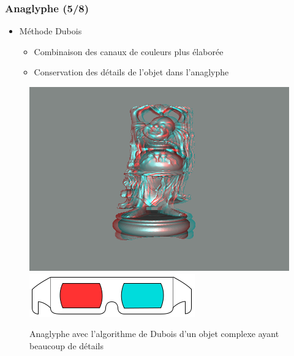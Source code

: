 \documentclass{beamer}
\begin{document}
%
\begin{frame}
\frametitle{Anaglyphe (5/8)}
\begin{itemize}[label=$\bullet$]
\item Méthode Dubois \cite{algoDubois}
	\begin{itemize}[label=$\circ$]
	\item Combinaison des canaux de couleurs plus élaborée
	\item Conservation des détails de l'objet dans l'anaglyphe 
	\end{itemize}
\end{itemize}
\begin{figure}
\centering
\includegraphics[scale=0.3]{happy_dubois.png}
\includegraphics[scale=0.2]{lunettes.png}
\caption{Anaglyphe avec l'algorithme de Dubois d'un objet complexe ayant beaucoup de détails}
\end{figure}

\end{frame}
\end{document}
